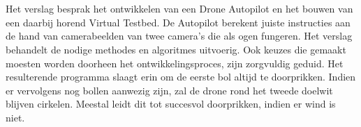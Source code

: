 \\
\\
Het verslag besprak het ontwikkelen van een Drone Autopilot en het bouwen van een daarbij horend Virtual Testbed. De Autopilot berekent juiste instructies aan de hand van camerabeelden van twee camera’s die als ogen fungeren. Het verslag behandelt de nodige methodes en algoritmes uitvoerig. Ook keuzes die gemaakt moesten worden doorheen het ontwikkelingsproces, zijn zorgvuldig geduid. Het resulterende programma slaagt erin om de eerste bol altijd te doorprikken. Indien er vervolgens nog bollen aanwezig zijn, zal de drone rond het tweede doelwit blijven cirkelen. Meestal leidt dit tot succesvol doorprikken, indien er wind is niet. 
